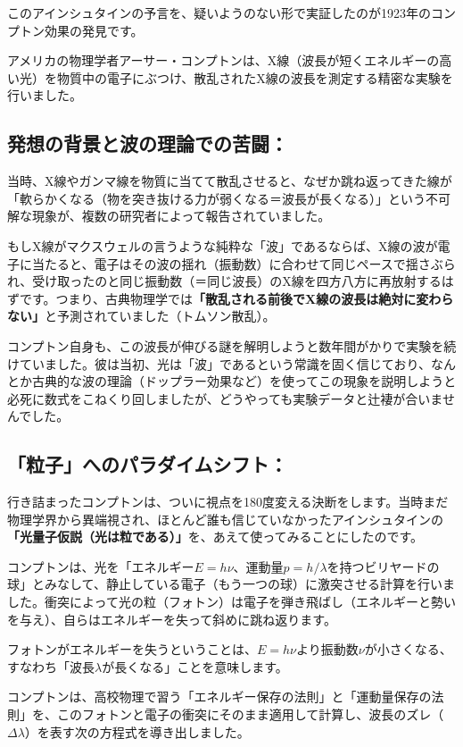 このアインシュタインの予言を、疑いようのない形で実証したのが1923年のコンプトン効果の発見です。

アメリカの物理学者アーサー・コンプトンは、X線（波長が短くエネルギーの高い光）を物質中の電子にぶつけ、散乱されたX線の波長を測定する精密な実験を行いました。

\subsection{発想の背景と波の理論での苦闘：}

当時、X線やガンマ線を物質に当てて散乱させると、なぜか跳ね返ってきた線が「軟らかくなる（物を突き抜ける力が弱くなる＝波長が長くなる）」という不可解な現象が、複数の研究者によって報告されていました。

もしX線がマクスウェルの言うような純粋な「波」であるならば、X線の波が電子に当たると、電子はその波の揺れ（振動数）に合わせて同じペースで揺さぶられ、受け取ったのと同じ振動数（＝同じ波長）のX線を四方八方に再放射するはずです。つまり、古典物理学では\textbf{「散乱される前後でX線の波長は絶対に変わらない」}と予測されていました（トムソン散乱）。

コンプトン自身も、この波長が伸びる謎を解明しようと数年間がかりで実験を続けていました。彼は当初、光は「波」であるという常識を固く信じており、なんとか古典的な波の理論（ドップラー効果など）を使ってこの現象を説明しようと必死に数式をこねくり回しましたが、どうやっても実験データと辻褄が合いませんでした。

\subsection{「粒子」へのパラダイムシフト：}

行き詰まったコンプトンは、ついに視点を180度変える決断をします。当時まだ物理学界から異端視され、ほとんど誰も信じていなかったアインシュタインの\textbf{「光量子仮説（光は粒である）」}を、あえて使ってみることにしたのです。

コンプトンは、光を「エネルギー\(E=h\nu\)、運動量\(p=h/\lambda\)を持つビリヤードの球」とみなして、静止している電子（もう一つの球）に激突させる計算を行いました。衝突によって光の粒（フォトン）は電子を弾き飛ばし（エネルギーと勢いを与え）、自らはエネルギーを失って斜めに跳ね返ります。

フォトンがエネルギーを失うということは、\(E=h\nu\)より振動数\(\nu\)が小さくなる、すなわち「波長\(\lambda\)が長くなる」ことを意味します。

コンプトンは、高校物理で習う「エネルギー保存の法則」と「運動量保存の法則」を、このフォトンと電子の衝突にそのまま適用して計算し、波長のズレ（\(\Delta \lambda\)）を表す次の方程式を導き出しました。

